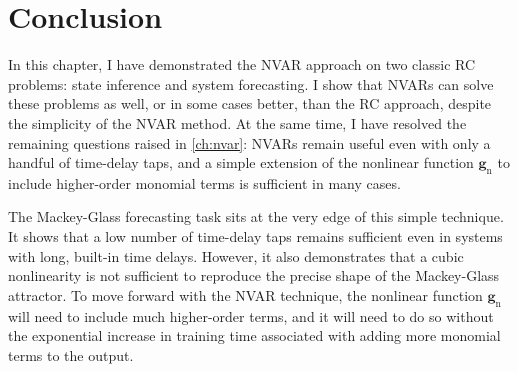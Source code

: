 
\section{Conclusion}

In this chapter, I have demonstrated the NVAR approach on two classic
RC problems: state inference and system forecasting. I show that
NVARs can solve these problems as well, or in some cases better, than
the RC approach, despite the simplicity of the NVAR method. At the
same time, I have resolved the remaining questions raised in
\cref{ch:nvar}: NVARs remain useful even with only a handful of
time-delay taps, and a simple extension of the nonlinear function
$\bm{g}_\text{n}$ to include higher-order monomial terms is sufficient
in many cases.

The Mackey-Glass forecasting task sits at the very edge of this simple
technique. It shows that a low number of time-delay taps remains
sufficient even in systems with long, built-in time delays. However,
it also demonstrates that a cubic nonlinearity is not sufficient to
reproduce the precise shape of the Mackey-Glass attractor. To move
forward with the NVAR technique, the nonlinear function
$\bm{g}_\text{n}$ will need to include much higher-order terms, and it
will need to do so without the exponential increase in training time
associated with adding more monomial terms to the output.

